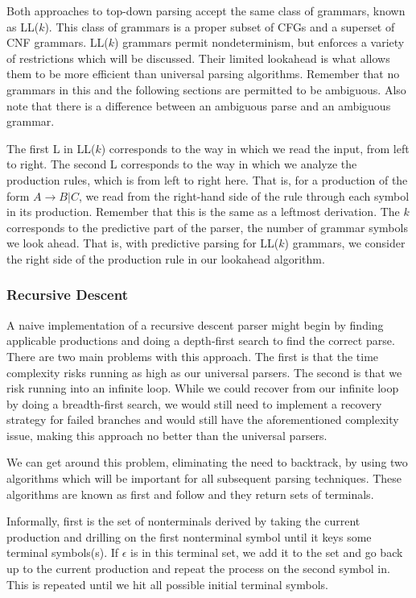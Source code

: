 \documentclass[a4paper, 10pt]{article}
\begin{document}
Both approaches to top-down parsing accept the same class of grammars, known as LL($k$). This class of grammars is a proper subset of CFGs and a superset of CNF grammars. LL($k$) grammars permit nondeterminism, but enforces a variety of restrictions which will be discussed. Their limited lookahead is what allows them to be more efficient than universal parsing algorithms. Remember that no grammars in this and the following sections are permitted to be ambiguous. Also note that there is a difference between an ambiguous parse and an ambiguous grammar.

The first L in LL($k$) corresponds to the way in which we read the input, from left to right. The second L corresponds to the way in which we analyze the production rules, which is from left to right here. That is, for a production of the form $A \rightarrow B | C$, we read from the right-hand side of the rule through each symbol in its production. Remember that this is the same as a leftmost derivation. The $k$ corresponds to the predictive part of the parser, the number of grammar symbols we look ahead. That is, with predictive parsing for LL($k$) grammars, we consider the right side of the production rule in our lookahead algorithm. 

\subsubsection{Recursive Descent}
A naive implementation of a recursive descent parser might begin by finding applicable productions and doing a depth-first search to find the correct parse. There are two main problems with this approach. The first is that the time complexity risks running as high as our universal parsers. The second is that we risk running into an infinite loop. While we could recover from our infinite loop by doing a breadth-first search, we would still need to implement a recovery strategy for failed branches and would still have the aforementioned complexity issue, making this approach no better than the universal parsers.

We can get around this problem, eliminating the need to backtrack, by using two algorithms which will be important for all subsequent parsing techniques. These algorithms are known as {\sc first} and {\sc follow} and they return sets of terminals. 

Informally, {\sc first} is the set of nonterminals derived by taking the current production and drilling on the first nonterminal symbol until it keys some terminal symbols(s). If $\epsilon$ is in this terminal set, we add it to the set and go back up to the current production and repeat the process on the second symbol in. This is repeated until we hit all possible initial terminal symbols. 
\end{document}
